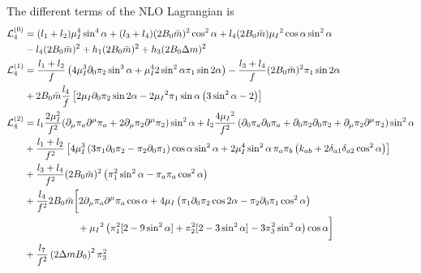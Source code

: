 The different terms of the NLO Lagrangian is
\begin{align}
    \nonumber
    \mathcal{L}_4^{(0)} & =
    (l_1 + l_2)\mu_I^4 \sin^4{\alpha}
    + (l_3 + l_4)(2 B_0 \bar m)^2 \cos^2{\alpha}
    + l_4 (2 B_0 \bar m ) \mu_I{}^2 \cos{\alpha} \sin^2{\alpha}
    \\ \label{NLO-L0}
    &
    - l_4 (2B_0 \bar m )^2
    + h_1 (2B_0 \bar m)^2
    + h_3 (2B_0 \Delta m)^2
    \\
    \nonumber
    \mathcal{L}_4^{(1)} & =
    \frac{l_1 + l_2}{f}
    \left(
        4 \mu_I^3 
        \partial_0 \pi_2 \sin^3{\alpha}
        + \mu_I^4 
        2 \sin^2{\alpha} \pi_1 \sin{2\alpha}
    \right)
    -
    \frac{l_3 + l_4}{f}
    (2 B_0 \bar m)^2
    \pi_1 \sin{2\alpha}
    \\ \label{NLO-L1}
    & 
    +
    2 B_0 \bar m
    \frac{l_4}{f}
    \left[
        2 \mu_I 
        \partial_0 \pi_2 \sin{2\alpha}
        - 2 \mu_I{}^2
        \pi_1 \sin{\alpha}
        \left(3\sin^2{\alpha} - 2\right)
    \right]
    \\
    \nonumber
    \mathcal{L}_4^{(2)} & = 
    l_1
    \frac{2 \mu_I^2}{f^2}
        (\partial_\mu \pi_a \partial^\mu \pi_a + 2 \partial_\mu \pi_2 \partial^\mu \pi_2)
        \sin^2{\alpha}
    + l_2 
    \frac{4 \mu_I{}^2}{f^2}
    \left(
        \partial_0 \pi_a\partial_0 \pi_a 
        + \partial_0 \pi_2\partial_0 \pi_2
        + \partial_\mu \pi_2 \partial^\mu \pi_2 
    \right) 
    \sin^2{\alpha}
    \\ \nonumber
    & + 
    \frac{l_1 + l_2}{f^2}
    \left[
        4 \mu_I^3 
        \left( 3 \pi_1 \partial_0 \pi_2 - \pi_2 \partial_0 \pi_1 \right)
        \cos{\alpha} \sin^2{\alpha}
        + 2 \mu_I^4  \sin^2{\alpha} \, \pi_a \pi_b 
            \left(k_{ab} + 2\delta_{a1}\delta_{a2}\cos^2{\alpha} \right)
    \right]
    \\ \nonumber
    & +
    \frac{l_3 + l_4}{f^2}
    (2 B_0 \bar m)^2
    \left(\pi_1^2 \sin^2{\alpha} - \pi_a \pi_a \cos^2{\alpha}\right)
    \\ \nonumber
    &
    +  \frac{l_4}{f^2}
    2 B_0 \bar m
    \bigg[
    2 \partial_\mu \pi_a \partial^\mu \pi_a \cos{\alpha}
    + 4 \mu_I 
    \left(
        \pi_1 \partial_0 \pi_2 \cos{2\alpha}
        - \pi_2 \partial_0 \pi_1\cos^2{\alpha}
    \right)
    \\ \nonumber
    & \hspace{55 pt}
    + \mu_I{}^2
    \left(                
        \pi_1^2[2 - 9 \sin^2{\alpha}]
        + \pi_2^2 [2 - 3 \sin^2{\alpha}]
        - 3\pi_3^2\sin^2{\alpha}
    \right)
    \cos{\alpha}
    \bigg]
    \\ \label{NLO-L2}
    &
    + \frac{l_7}{f^2}
    \left( 2 \Delta m B_0 \right)^2 \pi_3^2
\end{align}

